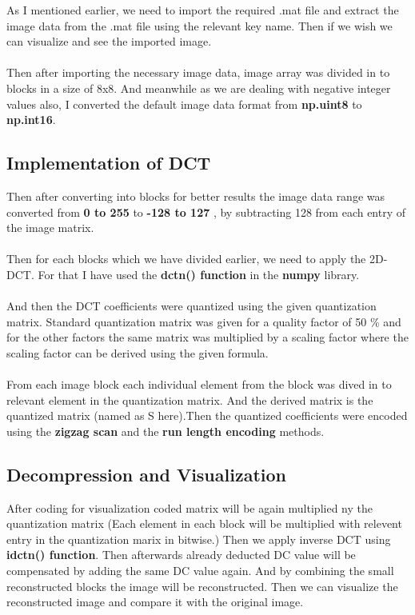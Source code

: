 \documentclass[11pt,a4paper]{article}
\begin{document}
As I mentioned earlier, we need to import the required .mat file and extract the image data from the .mat file using the relevant key name. Then if we wish we can visualize and see the imported image.
\\\\
Then after importing the necessary image data, image array was divided in to blocks in a size of 8x8. And meanwhile as we are dealing with negative integer values also, I converted the default image data format from \textbf{np.uint8} to \textbf{np.int16}.


\subsection{Implementation of DCT}

Then after converting into blocks for better results the image data range was converted from \textbf{0 to 255} to \textbf{-128 to 127} , by subtracting 128 from each entry of the image matrix. 
\\
\\
Then for each blocks which we have divided earlier, we need to apply the 2D-DCT. For that I have used the \textbf{dctn() function }  in the \textbf{numpy} library.
\\\\
And then the DCT coefficients were quantized using the given quantization matrix. Standard quantization matrix was given for a quality factor of 50 \% and for the other factors the same matrix was multiplied by a scaling factor where the scaling factor can be derived using the given formula.
\\\\
From each image block each individual element from the block was dived in to relevant element in the quantization matrix. And the derived matrix is the quantized matrix (named as S here).Then the quantized coefficients were encoded using the \textbf{zigzag scan} and the \textbf{run length encoding} methods. 

\subsection{Decompression and Visualization}

After coding for visualization coded matrix will be again multiplied ny the quantization matrix (Each element in each block will be multiplied with relevent entry in the quantization marix in bitwise.) Then we apply inverse DCT using \textbf{idctn() function}. Then afterwards already deducted DC value will be compensated by adding the same DC value again. And by combining the small reconstructed blocks the image will be reconstructed. Then we can visualize the reconstructed image and compare it with the original image.
\end{document}
